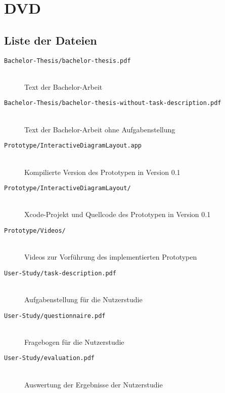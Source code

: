
\chapter{DVD}

\section{Liste der Dateien}

\begin{description}
    \item[\texttt{Bachelor-Thesis/bachelor-thesis.pdf}] 
        \hfill \\ Text der Bachelor-Arbeit
    \item[\texttt{Bachelor-Thesis/bachelor-thesis-without-task-description.pdf}] 
        \hfill \\ Text der Bachelor-Arbeit ohne Aufgabenstellung
    \item[\texttt{Prototype/InteractiveDiagramLayout.app}]
        \hfill \\ Kompilierte Version des Prototypen in Version 0.1
    \item[\texttt{Prototype/InteractiveDiagramLayout/}] 
        \hfill \\ Xcode-Projekt und 
Quellcode des Prototypen in Version 0.1
    \item[\texttt{Prototype/Videos/}] 
        \hfill \\ Videos zur Vorführung des implementierten Prototypen
    \item[\texttt{User-Study/task-description.pdf}] 
        \hfill \\ Aufgabenstellung für die Nutzerstudie
    \item[\texttt{User-Study/questionnaire.pdf}]
        \hfill \\ Fragebogen für die Nutzerstudie
    \item[\texttt{User-Study/evaluation.pdf}]
        \hfill \\ Auswertung der Ergebnisse der Nutzerstudie
\end{description}
